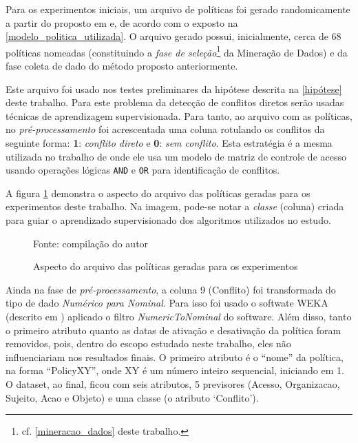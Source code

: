 Para os experimentos iniciais, um arquivo de políticas foi gerado randomicamente a partir do proposto em  e, de acordo com o exposto na \autoref{modelo_politica_utilizada}. O arquivo gerado possui, inicialmente, cerca de 68 políticas nomeadas (constituindo a \textit{fase de seleção}\footnote{cf. \autoref{mineracao_dados} deste trabalho.} da Mineração de Dados) e da fase coleta de dado do método proposto anteriormente. 

Este arquivo foi usado nos testes preliminares da hipótese descrita na \autoref{hipótese} deste trabalho. Para este problema da detecção de conflitos diretos serão usadas técnicas de aprendizagem supervisionada. Para tanto, ao arquivo com as políticas, no \textit{pré-processamento }foi acrescentada uma coluna rotulando os conflitos da seguinte forma: \textbf{1}: \textit{conflito direto} e \textbf{0}: \textit{sem conflito}. Esta estratégia é a mesma utilizada no trabalho de  onde ele usa um modelo de matriz de controle de acesso usando operações lógicas \texttt{AND} e \texttt{OR} para identificação de conflitos.

A figura \ref{fig:aspecto_arquivo} demonstra o aspecto do arquivo das políticas geradas para os experimentos deste trabalho. Na imagem, pode-se notar a \textit{classe} (coluna) criada para guiar o aprendizado supervisionado dos algoritmos utilizados no estudo.

\begin{figure}[h!]
	\centering
	\caption{Aspecto do arquivo das políticas geradas para os experimentos}
	
	\label{fig:aspecto_arquivo}
	{\scriptsize Fonte: compilação do autor}
\end{figure}

Ainda na fase de \textit{pré-processamento}, a coluna 9 (Conflito) foi transformada do tipo de dado \textit{Numérico para Nominal}. Para isso foi usado o softwate WEKA (descrito em ) aplicado o filtro \textit{NumericToNominal} do software. Além disso, tanto o primeiro atributo quanto as datas de ativação e desativação da política foram removidos, pois, dentro do escopo estudado neste trabalho, eles não influenciariam nos resultados finais. O primeiro atributo é o ``nome'' da política, na forma ``PolicyXY'', onde XY é um número inteiro sequencial, iniciando em 1. O dataset, ao final, ficou com seis atributos, 5 previsores (Acesso, Organizacao, Sujeito, Acao e Objeto) e uma classe (o atributo `Conflito').

